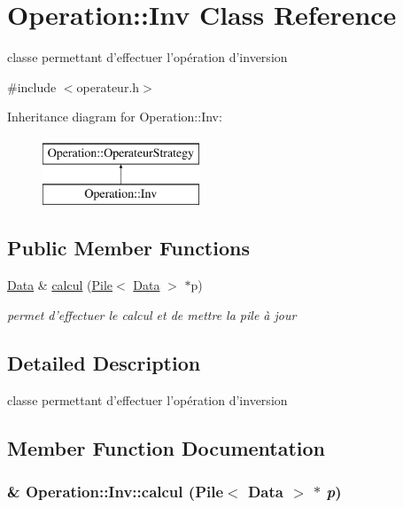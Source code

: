 \hypertarget{classOperation_1_1Inv}{
\section{Operation::Inv Class Reference}
\label{classOperation_1_1Inv}
}


classe permettant d'effectuer l'opération d'inversion  




{\ttfamily \#include $<$operateur.h$>$}

Inheritance diagram for Operation::Inv:\begin{figure}[H]
\begin{center}
\leavevmode
\includegraphics[height=2cm]{classOperation_1_1Inv}
\end{center}
\end{figure}
\subsection*{Public Member Functions}
\begin{DoxyCompactItemize}
\item 
\hyperlink{classNombre_1_1Data}{Data} \& \hyperlink{classOperation_1_1Inv_ae94cca0befd519a43d41753153b240f9}{calcul} (\hyperlink{classPile}{Pile}$<$ \hyperlink{classNombre_1_1Data}{Data} $>$ $\ast$p)
\begin{DoxyCompactList}\small\item\em permet d'effectuer le calcul et de mettre la pile à jour \item\end{DoxyCompactList}\end{DoxyCompactItemize}


\subsection{Detailed Description}
classe permettant d'effectuer l'opération d'inversion 

\subsection{Member Function Documentation}
\hypertarget{classOperation_1_1Inv_ae94cca0befd519a43d41753153b240f9}{
\subsubsection[{calcul}]{\& Operation::Inv::calcul ({\bf Pile}$<$ {\bf Data} $>$ $\ast$ {\em p})}}
\label{classOperation_1_1Inv_ae94cca0befd519a43d41753153b240f9}


